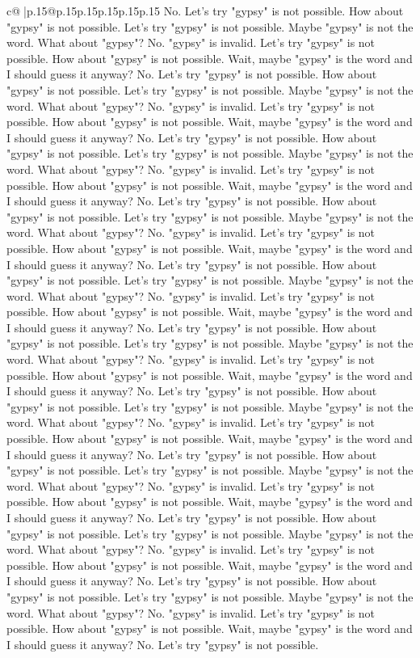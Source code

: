 \documentclass{article}
\begin{document}
{\begin{supertabular}{c@{$\;$}|p{.15\linewidth}@{}p{.15\linewidth}p{.15\linewidth}p{.15\linewidth}p{.15\linewidth}p{.15\linewidth}}
{{{No. Let's try "gypsy" is not possible. How about "gypsy" is not possible. Let's try "gypsy" is not possible. Maybe "gypsy" is not the word. What about "gypsy"? No. "gypsy" is invalid. Let's try "gypsy" is not possible. How about "gypsy" is not possible. Wait, maybe "gypsy" is the word and I should guess it anyway? No. Let's try "gypsy" is not possible. How about "gypsy" is not possible. Let's try "gypsy" is not possible. Maybe "gypsy" is not the word. What about "gypsy"? No. "gypsy" is invalid. Let's try "gypsy" is not possible. How about "gypsy" is not possible. Wait, maybe "gypsy" is the word and I should guess it anyway? No. Let's try "gypsy" is not possible. How about "gypsy" is not possible. Let's try "gypsy" is not possible. Maybe "gypsy" is not the word. What about "gypsy"? No. "gypsy" is invalid. Let's try "gypsy" is not possible. How about "gypsy" is not possible. Wait, maybe "gypsy" is the word and I should guess it anyway? No. Let's try "gypsy" is not possible. How about "gypsy" is not possible. Let's try "gypsy" is not possible. Maybe "gypsy" is not the word. What about "gypsy"? No. "gypsy" is invalid. Let's try "gypsy" is not possible. How about "gypsy" is not possible. Wait, maybe "gypsy" is the word and I should guess it anyway? No. Let's try "gypsy" is not possible. How about "gypsy" is not possible. Let's try "gypsy" is not possible. Maybe "gypsy" is not the word. What about "gypsy"? No. "gypsy" is invalid. Let's try "gypsy" is not possible. How about "gypsy" is not possible. Wait, maybe "gypsy" is the word and I should guess it anyway? No. Let's try "gypsy" is not possible. How about "gypsy" is not possible. Let's try "gypsy" is not possible. Maybe "gypsy" is not the word. What about "gypsy"? No. "gypsy" is invalid. Let's try "gypsy" is not possible. How about "gypsy" is not possible. Wait, maybe "gypsy" is the word and I should guess it anyway? No. Let's try "gypsy" is not possible. How about "gypsy" is not possible. Let's try "gypsy" is not possible. Maybe "gypsy" is not the word. What about "gypsy"? No. "gypsy" is invalid. Let's try "gypsy" is not possible. How about "gypsy" is not possible. Wait, maybe "gypsy" is the word and I should guess it anyway? No. Let's try "gypsy" is not possible. How about "gypsy" is not possible. Let's try "gypsy" is not possible. Maybe "gypsy" is not the word. What about "gypsy"? No. "gypsy" is invalid. Let's try "gypsy" is not possible. How about "gypsy" is not possible. Wait, maybe "gypsy" is the word and I should guess it anyway? No. Let's try "gypsy" is not possible. How about "gypsy" is not possible. Let's try "gypsy" is not possible. Maybe "gypsy" is not the word. What about "gypsy"? No. "gypsy" is invalid. Let's try "gypsy" is not possible. How about "gypsy" is not possible. Wait, maybe "gypsy" is the word and I should guess it anyway? No. Let's try "gypsy" is not possible. How about "gypsy" is not possible. Let's try "gypsy" is not possible. Maybe "gypsy" is not the word. What about "gypsy"? No. "gypsy" is invalid. Let's try "gypsy" is not possible. How about "gypsy" is not possible. Wait, maybe "gypsy" is the word and I should guess it anyway? No. Let's try "gypsy" is not possible. }}}
\end{supertabular}}
\end{document}
